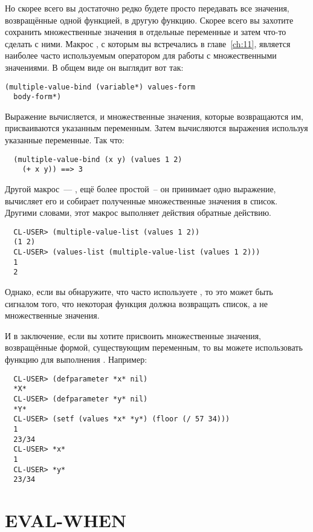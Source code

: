 Но скорее всего вы достаточно редко будете просто передавать все значения, возвращённые
одной функцией, в другую функцию.  Скорее всего вы захотите сохранить множественные
значения в отдельные переменные и затем что-то сделать с ними.  Макрос
, с которым вы встречались в главе~\ref{ch:11}, является
наиболее часто используемым оператором для работы с множественными значениями.  В общем
виде он выглядит вот так:

\begin{lstlisting}
(multiple-value-bind (variable*) values-form
  body-form*)
\end{lstlisting}

Выражение  вычисляется, и множественные значения, которые возвращаются
им, присваиваются указанным переменным.  Затем вычисляются выражения 
используя указанные переменные.  Так что:

\begin{verbatim}
  (multiple-value-bind (x y) (values 1 2)
    (+ x y)) ==> 3
\end{verbatim}

Другой макрос~--- , ещё более простой~-- он принимает одно
выражение, вычисляет его и собирает полученные множественные значения в список.  Другими
словами, этот макрос выполняет действия обратные действию.

\begin{verbatim}
  CL-USER> (multiple-value-list (values 1 2))
  (1 2)
  CL-USER> (values-list (multiple-value-list (values 1 2)))
  1
  2
\end{verbatim}

Однако, если вы обнаружите, что часто используете , то это может
быть сигналом того, что некоторая функция должна возвращать список, а не множественные
значения.

И в заключение, если вы хотите присвоить множественные значения, возвращённые формой,
существующим переменным, то вы можете использовать функцию  для выполнения
.  Например:

\begin{verbatim}
  CL-USER> (defparameter *x* nil)
  *X*
  CL-USER> (defparameter *y* nil)
  *Y*
  CL-USER> (setf (values *x* *y*) (floor (/ 57 34)))
  1
  23/34
  CL-USER> *x*
  1
  CL-USER> *y*
  23/34
\end{verbatim}

\section{EVAL-WHEN}

